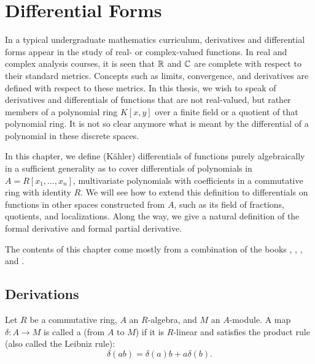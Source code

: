 
\section{Differential Forms}
\label{chap_differentials}

In a typical undergraduate mathematics curriculum,
derivatives and differential forms appear in the study of real- or complex-valued functions.
In real and complex analysis courses,
it is seen that $\mathbb{R}$ and $\mathbb{C}$ are complete with respect to their standard metrics.
Concepts such as limits, convergence, and derivatives are defined with respect to these metrics.
In this thesis, we wish to speak of derivatives and differentials of functions that are not real-valued,
but rather members of a polynomial ring $K[x,y]$ over a finite field or a quotient of that polynomial ring.
It is not so clear anymore what is meant by the differential of a polynomial in these discrete spaces.

In this chapter, we define (K\"ahler) differentials of functions purely algebraically
in a sufficient generality as to cover differentials of polynomials in $A = R[x_1, \ldots, x_n]$,
multivariate polynomials with coefficients in a commutative ring with identity $R$.
We will see how to extend this definition to differentials on functions in other spaces constructed from $A$,
such as its field of fractions, quotients, and localizations.
Along the way, we give a natural definition of the formal derivative and formal partial derivative.

The contents of this chapter come mostly from a combination of the books
\cite{eisenbud95}, \cite{eisenbud00}, \cite{goldschmidt03}, and \cite{stichtenoth09}.




\subsection{Derivations}
\begin{definition}
  Let $R$ be a commutative ring, $A$ an $R$-algebra, and $M$ an $A$-module.
  A map $\delta : A \to M$ is called a  (from $A$ to $M$)
  if it is $R$-linear and satisfies the product rule
  (also called the Leibniz rule):
    \[ \delta(ab) = \delta(a)b + a\delta(b). \]
\end{definition}

